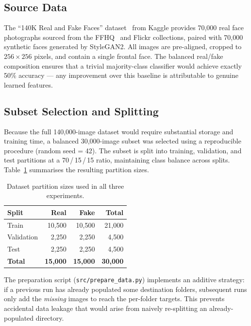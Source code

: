 \documentclass[12pt, a4paper]{article}
\begin{document}
\subsection{Source Data}

The ``140K Real and Fake Faces'' dataset~\cite{dataset140k} from Kaggle
provides 70,000 real face photographs sourced from the
FFHQ~\cite{karras2020stylegan2} and Flickr collections, paired with 70,000
synthetic faces generated by StyleGAN2.  All images are pre-aligned, cropped
to $256 \times 256$ pixels, and contain a single frontal face.  The
balanced real/fake composition ensures that a trivial majority-class
classifier would achieve exactly 50\% accuracy — any improvement over this
baseline is attributable to genuine learned features.

\subsection{Subset Selection and Splitting}

Because the full 140,000-image dataset would require substantial storage and
training time, a balanced 30,000-image subset was selected using a
reproducible procedure (random seed = 42).  The subset is split into training,
validation, and test partitions at a 70\,/\,15\,/\,15 ratio, maintaining
class balance across splits.  Table~\ref{tab:split} summarises the resulting
partition sizes.

\begin{table}[H]
\centering
\caption{Dataset partition sizes used in all three experiments.}
\label{tab:split}
\begin{tabular}{lrrr}
\toprule
\textbf{Split} & \textbf{Real} & \textbf{Fake} & \textbf{Total} \\
\midrule
Train & 10,500 & 10,500 & 21,000 \\
Validation & 2,250 & 2,250 & 4,500 \\
Test & 2,250 & 2,250 & 4,500 \\
\midrule
\textbf{Total} & \textbf{15,000} & \textbf{15,000} & \textbf{30,000} \\
\bottomrule
\end{tabular}
\end{table}

The preparation script (\texttt{src/prepare\_data.py}) implements an additive
strategy: if a previous run has already populated some destination folders,
subsequent runs only add the \emph{missing} images to reach the per-folder
targets.  This prevents accidental data leakage that would arise from
naively re-splitting an already-populated directory.
\end{document}

